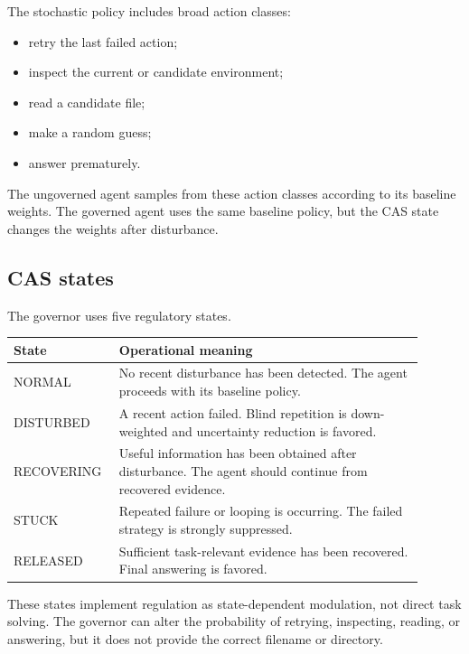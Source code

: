 \documentclass[11pt]{article}
\begin{document}
The stochastic policy includes broad action classes:

\begin{itemize}[leftmargin=1.5em]
    \item retry the last failed action;
    \item inspect the current or candidate environment;
    \item read a candidate file;
    \item make a random guess;
    \item answer prematurely.
\end{itemize}

The ungoverned agent samples from these action classes according to its baseline weights. The governed agent uses the same baseline policy, but the CAS state changes the weights after disturbance.

\subsection{CAS states}

The governor uses five regulatory states.

\begin{center}
\begin{tabular}{p{0.20\linewidth} p{0.70\linewidth}}
\toprule
\textbf{State} & \textbf{Operational meaning} \\
\midrule
NORMAL & No recent disturbance has been detected. The agent proceeds with its baseline policy. \\
DISTURBED & A recent action failed. Blind repetition is down-weighted and uncertainty reduction is favored. \\
RECOVERING & Useful information has been obtained after disturbance. The agent should continue from recovered evidence. \\
STUCK & Repeated failure or looping is occurring. The failed strategy is strongly suppressed. \\
RELEASED & Sufficient task-relevant evidence has been recovered. Final answering is favored. \\
\bottomrule
\end{tabular}
\end{center}

These states implement regulation as state-dependent modulation, not direct task solving. The governor can alter the probability of retrying, inspecting, reading, or answering, but it does not provide the correct filename or directory.
\end{document}
